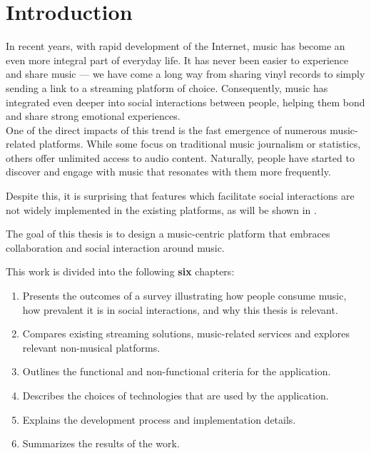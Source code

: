 \chapter{Introduction}\label{chap:intro}


In recent years, with rapid development of the Internet,
music has become an even more integral part of everyday life.\cite{music_role_life}
It has never been easier to experience and share music — we have come
a long way from sharing vinyl records to simply sending a link to a streaming platform of choice.
Consequently, music has integrated even deeper into social interactions between people,
helping them bond and share strong emotional experiences.\cite{music_role_life}
\\
One of the direct impacts of this trend is the fast emergence of numerous music-related platforms.
While some focus on traditional music journalism or statistics, others offer unlimited access to audio content.
Naturally, people have started to discover and engage with music that resonates with them more frequently.\cite{music_role_life}

Despite this, it is surprising that features which facilitate social interactions are not widely implemented in the
existing platforms, as will be shown in .

The goal of this thesis is to design a music-centric platform that embraces
collaboration and social interaction around music.

This work is divided into the following \textbf{six} chapters:

\begin{enumerate}
    \item \textbf{}
    Presents the outcomes of a survey illustrating how people consume music,
    how prevalent it is in social interactions, and why this thesis is relevant.

    \item \textbf{}
    Compares existing streaming solutions, music-related services
    and explores relevant non-musical platforms.

    \item \textbf{}
    Outlines the functional and non-functional criteria for the application.

    \item \textbf{}
    Describes the choices of technologies that are used by the application.

    \item \textbf{}
    Explains the development process and implementation details.

    \item \textbf{}
    Summarizes the results of the work.
\end{enumerate}